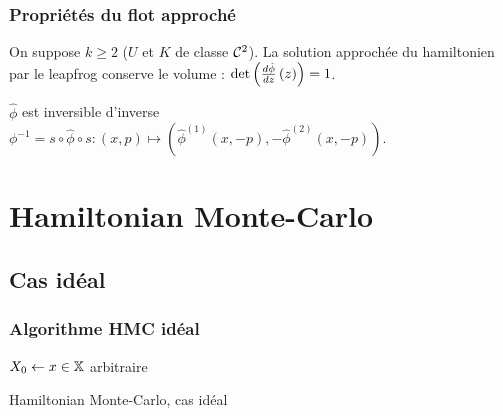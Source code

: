 \documentclass[10pt]{beamer}
\begin{document}
\begin{frame}
	\frametitle{Propriétés du flot approché}
	\begin{Prop}
		On suppose $k \geq 2$ ($U$ et $K$ de classe $\mathcal{C}^2$). La solution approchée du hamiltonien par le leapfrog conserve le volume : $\det \left( \frac{d \hat \phi}{d z} \left( z \right) \right) = 1$.
	\end{Prop}
	\begin{Prop}
		$\hat \phi$ est inversible d'inverse $\phi^{-1} = s \circ \hat \phi \circ s : (x,p) \mapsto (\hat{\phi}^{(1)}(x,-p), -\hat{\phi}^{(2)}(x,-p))$.
	\end{Prop}
\end{frame}
 
\section{Hamiltonian Monte-Carlo}

\subsection{Cas idéal}
 
 
\begin{frame}
	\frametitle{Algorithme HMC idéal}
	\begin{center}
		\begin{algorithm}[H]
			$X_0 \leftarrow x \in \mathbb{X}$ arbitraire\;
			\caption{Hamiltonian Monte-Carlo, cas idéal}
			\label{algo:HMC-ideal}
		\end{algorithm}
	\end{center}
\end{frame}
\end{document}
